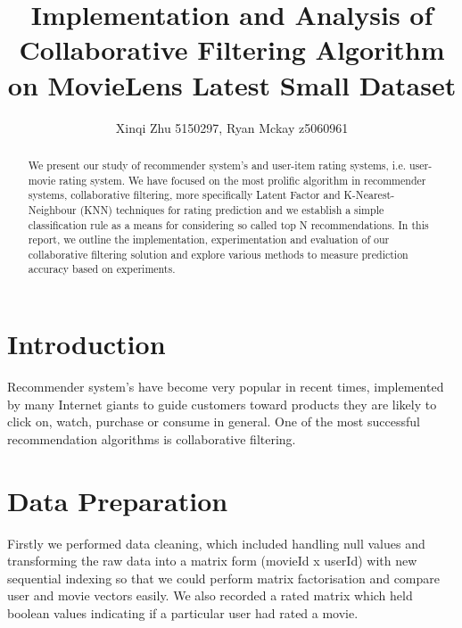 \documentclass[12pt]{article}
\title{Implementation and Analysis of Collaborative Filtering Algorithm on MovieLens Latest Small Dataset}
\author{Xinqi Zhu 5150297, Ryan Mckay z5060961}
\begin{document}
 

\maketitle

\begin{abstract}
We present our study of recommender system's and user-item rating systems, i.e. user-movie rating system. We have focused on the most prolific algorithm in recommender systems, collaborative filtering, more specifically Latent Factor and K-Nearest-Neighbour (KNN) techniques for rating prediction and we establish a simple classification rule as a means for considering so called top N recommendations. In this report, we outline the implementation, experimentation and evaluation of our collaborative filtering solution and explore various methods to measure prediction accuracy based on experiments. 
\end{abstract}


\section{Introduction}

Recommender system's have become very popular in recent times, implemented by many Internet giants to guide customers toward products they are likely to click on, watch, purchase or consume in general. One of the most successful recommendation algorithms is collaborative filtering.

%



\section{Data Preparation}

Firstly we performed data cleaning, which included handling null values and transforming the raw data into a matrix form (movieId x userId) with new sequential indexing so that we could perform matrix factorisation and compare user and movie vectors easily. We also recorded a rated matrix which held boolean values indicating if a particular user had rated a movie.
\end{document}
